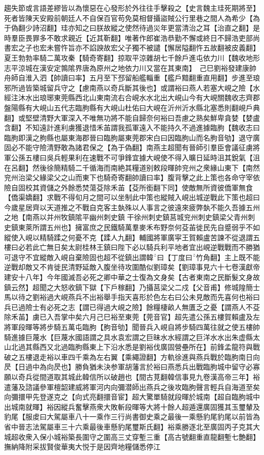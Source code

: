 趨失節或言語差繆皆以為懷惡在心發形於外往往手擊殺之【史言魏主珪死期將至】死者皆陳天安殿前朝廷人不自保百官苟免莫相督攝盜賊公行里巷之間人為希少【為于偽翻少詩沼翻】珪亦知之曰朕故縱之使然待過災年更當清治之耳【治直之翻】是時羣臣畏罪多不敢求親近【近其靳翻】唯著作郎崔浩恭勤不懈或終日不歸浩吏部尚書宏之子也宏未嘗忤旨亦不諂諛故宏父子獨不被譴【懈居隘翻忤五故翻被皮義翻】　夏王勃勃率騎二萬攻秦【騎奇寄翻】掠取平涼雜胡七千餘戶進屯依力川【魏收地形志平涼城在漢安定鶉隂界唐為原州之地依力川又當在其東南】　己巳劉裕發建康帥舟師自淮入泗【帥讀曰率】五月至下邳留船艦輜重【艦戶黯翻重直用翻】步進至琅邪所過皆築城留兵守之【慮南燕以奇兵斷其後也】或謂裕曰燕人若塞大峴之險【水經注沐水出琅琊東莞縣西北山東南流右合峴水水北出大峴山今有大峴關魏收志齊郡盤陽縣有大峴山五代志臨胊縣有大峴山杜佑曰大峴在沂州沂水縣北塞悉則翻峴戶典翻】或堅壁清野大軍深入不唯無功將不能自歸奈何裕曰吾慮之熟矣鮮卑貪婪【婪盧含翻】不知遠計進利虜獲退惜禾苖謂我孤軍遠入不能持久不過進據臨朐【魏收志曰臨朐即漢之朐縣也屬東海郡晉曰臨胊屬東莞郡宋白曰因臨胊山而名朐音劬】退守廣固必不能守險清野敢為諸君保之【為于偽翻】南燕主超聞有晉師引羣臣會議征虜將軍公孫五樓曰吳兵輕果利在速戰不可爭鋒宜據大峴使不得入曠日延時沮其銳氣【沮在呂翻】然後徐簡精騎二千循海而南絶其糧道别敕段暉帥兖州之衆緣山東下【南然兖州治梁父緣梁父之山而東下也騎奇寄翻帥讀曰率】腹背擊之此上策也各命守宰依險自固校其資儲之外餘悉焚蕩芟除禾苖【芟所銜翻下同】使敵無所資彼僑軍無食【僑渠嬌翻】求戰不得旬月之間可以坐制此中策也縱賊入峴出城逆戰此下策也超曰今歲星居齊以天道推之不戰自克客主埶殊以人事言之彼遠來疲弊埶不能久吾據五州之地【南燕以并州牧鎮隂平幽州刺史鎮干徐州刺史鎮莒城兖州刺史鎮梁父青州刺史鎮東萊所謂五州也】擁富庶之民鐵騎萬羣麥禾布野奈何芟苖徙民先自蹙弱乎不如縱使入峴以精騎蹂之何憂不克【蹂人九翻】輔國將軍廣寜王賀賴盧苦諫不從退謂五樓曰必若此亡無日矣太尉桂林王鎮曰陛下必以騎兵利平地者宜出峴逆戰戰而不勝猶可退守不宜縱敵入峴自棄險固也超不從鎮出謂韓曰【丁度曰竹角翻】主上既不能逆戰却敵又不肯徙民清野延敵入腹坐待攻圍酷似劉璋矣【劉璋事見六十七卷漢獻帝建安十八年】今年國滅吾必死之卿中華之士復為文身矣【古者東南之民斷髮文身故鎮云然】超聞之大怒收鎮下獄【下戶稼翻】乃攝莒梁父二戍【父音甫】修城隍簡士馬以待之劉裕過大峴燕兵不出裕舉手指天喜形於色左右曰公未見敵而先喜何也裕曰兵已過險士有必死之志【謂已得過大峴之險】餘糧棲畝人無匱乏之憂【謂燕人不芟除禾苖】虜已入吾掌中矣六月己巳裕至東莞【莞音官】超先遣公孫五樓賀賴盧及左將軍段暉等將步騎五萬屯臨朐【朐音劬】聞晉兵入峴自將步騎四萬往就之使五樓帥騎進據巨蔑水【巨蔑水國語謂之具水袁宏謂之巨昧水水經謂之巨洋水水出朱虚縣太山北過其縣西又北過臨朐縣東上下沿水悉是劉裕伐廣固營壘所在】前鋒孟龍符與戰破之五樓退走裕以車四千乘為左右翼【乘繩證翻】方軌徐進與燕兵戰於臨朐南日向昃【日過中為向昃也】勝負猶未決参軍胡藩言於裕曰燕悉兵出戰臨朐城中留守必寡願以奇兵從間道取其城此韓信所以破趙也【間古莧翻韓信事見九卷漢高帝三年】裕遣藩及諮議參軍檀韶建威將軍河内向彌潜師出燕兵之後攻臨朐聲言輕兵自海道至矣向彌擐甲先登遂克之【向式亮翻擐音宦】超大驚單騎就段暉於城南【超自臨胊城中出城南就暉】裕因縱兵奮擊燕衆大敗斬段暉等大將十餘人超遁還廣固獲其玉璽輦及豹尾【服䖍曰大駕屬車八十一乘作三行尚書御史乘之最後一乘懸豹尾豹尾以前皆為省中晉志法駕屬車三十六乘最後車懸豹尾璽斯氏翻】裕乘勝逐北至廣固丙子克其大城超收衆入保小城裕築長圍守之圍高三丈穿塹三重【高古號翻重直龍翻塹七艶翻】撫納降附采拔賢俊華夷大悦于是因齊地糧儲悉停江